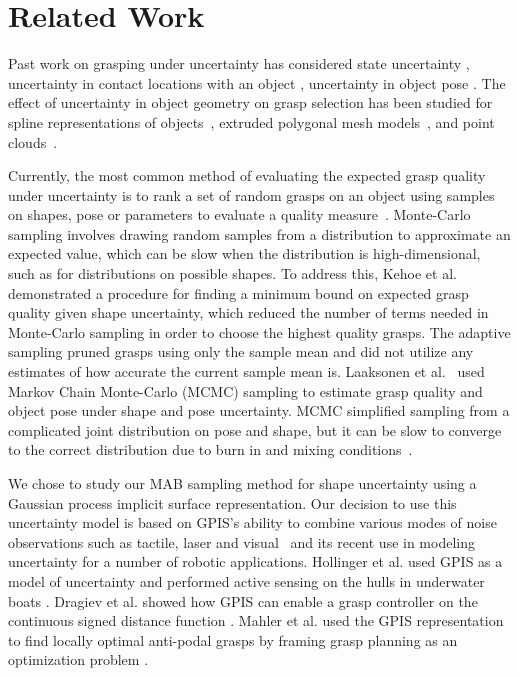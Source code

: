 \documentclass[letterpaper, 10 pt, conference]{ieeeconf}  %
\begin{document}
\section{Related Work}

Past work on grasping under uncertainty has considered state uncertainty \cite{goldberg1990bayesian, stulp2011learning}, uncertainty in contact locations with an object \cite{zheng2005}, uncertainty in object pose \cite{christopoulos2007handling, weisz2012pose, kim2012physically}.
The effect of uncertainty in object geometry on grasp selection has been studied for spline representations of objects~\cite{christopoulos2007handling}, extruded polygonal mesh models~\cite{kehoe2012estimating, kehoe2012toward}, and point clouds~\cite{hsiao2011bayesian}.

Currently, the most common method of evaluating the expected grasp quality under uncertainty is to rank a set of random grasps on an object using  samples on shapes, pose or parameters to evaluate a quality measure~\cite{christopoulos2007handling, kehoe2012estimating, kehoe2012toward}.
Monte-Carlo sampling involves drawing random samples from a distribution to approximate an expected value\cite{caflisch1998monte}, which can be slow when the distribution is high-dimensional, such as for distributions on possible shapes.
To address this, Kehoe et al.~\cite{kehoe2012estimating} demonstrated a procedure for finding a minimum bound on expected grasp quality given shape uncertainty, which reduced the number of terms needed in Monte-Carlo sampling in order to choose the highest quality grasps. The adaptive sampling pruned grasps using only the sample mean and did not utilize any estimates of how accurate the current sample mean is. 
Laaksonen et al.~\cite{laaksonen2012probabilistic} used Markov Chain Monte-Carlo (MCMC) sampling to estimate grasp quality and object pose  under shape and pose uncertainty.
MCMC simplified sampling from a complicated joint distribution on pose and shape, but it can be slow to converge to the correct distribution due to burn in and mixing conditions~\cite{andrieu2003introduction}.

We chose to study our MAB sampling method for shape uncertainty using a Gaussian process implicit surface representation. Our decision to use this uncertainty model is based on GPIS's ability to combine various modes of noise observations such as tactile, laser and visual~\cite{rasmussen2006, williams2007, dragiev2011} and its recent use in modeling uncertainty for a number of robotic applications.
Hollinger et al. used GPIS as a model of uncertainty and performed active sensing on the hulls in underwater boats \cite{hollinger2013}.
Dragiev et al. showed how GPIS can enable a grasp controller on the continuous signed distance function \cite{dragiev2011}.
Mahler et al. used the GPIS representation to find locally optimal anti-podal grasps by framing grasp planning as an optimization problem \cite{mahler2015opt}. 
\end{document}
